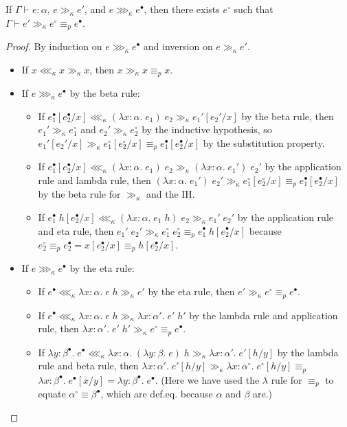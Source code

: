 \begin{lemma}\label{cr_lemma}
If $\Gamma\vdash e:\alpha$, $e\gg_\kappa e'$, and $e\ggg_\kappa e^\bullet$, then there exists $e^\circ$ such that $\Gamma\vdash e'\gg_\kappa e^\circ\equiv_p e^\bullet$.
\end{lemma}
\begin{proof}
By induction on $e\ggg_\kappa e^\bullet$ and inversion on $e\gg_\kappa e'$.
\begin{itemize}
\item If $x\lll_\kappa x\gg_\kappa x$, then $x\gg_\kappa x\equiv_p x$.
\item If $e\ggg_\kappa e^\bullet$ by the beta rule:
\begin{itemize}
\item If $e_1^\bullet[e_2^\bullet/x]\lll_\kappa(\lambda x:\alpha.\;e_1)\;e_2\gg_\kappa e_1'[e_2'/x]$ by the beta rule, then $e_1'\gg_\kappa e_1^\circ$ and $e_2'\gg_\kappa e_2^\circ$ by the inductive hypothesis, so $e_1'[e_2'/x]\gg_\kappa e_1^\circ[e_2^\circ/x]\equiv_p e_1^\bullet[e_2^\bullet/x]$ by the substitution property.
\item If $e_1^\bullet[e_2^\bullet/x]\lll_\kappa(\lambda x:\alpha.\;e_1)\;e_2\gg_\kappa (\lambda x:\alpha.\;e_1')\;e_2'$ by the application rule and lambda rule, then $(\lambda x:\alpha.\;e_1')\;e_2'\gg_\kappa e_1^\circ[e_2^\circ/x]\equiv_p e_1^\bullet[e_2^\bullet/x]$ by the beta rule for $\gg_\kappa$ and the IH.
\item If $e_1^\bullet\;h[e_2^\bullet/x]\lll_\kappa(\lambda x:\alpha.\;e_1\;h)\;e_2\gg_\kappa e_1'\;e_2'$ by the application rule and eta rule, then $e_1'\;e_2'\gg_\kappa e_1^\circ\;e_2^\circ\equiv_p e_1^\bullet\;h[e_2^\bullet/x]$ because $e_2^\circ\equiv_p e_2^\bullet=x[e_2^\bullet/x]\equiv_p h[e_2^\bullet/x]$.
\end{itemize}
\item If $e\ggg_\kappa e^\bullet$ by the eta rule:
\begin{itemize}
\item If $e^\bullet\lll_\kappa\lambda x:\alpha.\;e\;h\gg_\kappa e'$ by the eta rule, then $e'\gg_\kappa e^\circ\equiv_p e^\bullet$.
\item If $e^\bullet\lll_\kappa\lambda x:\alpha.\;e\;h\gg_\kappa \lambda x:\alpha'.\;e'\;h'$ by the lambda rule and application rule, then $\lambda x:\alpha'.\;e'\;h'\gg_\kappa e^\circ\equiv_p e^\bullet$.
\item If $\lambda y:\beta^\bullet.\;e^\bullet\lll_\kappa\lambda x:\alpha.\;(\lambda y:\beta.\;e)\;h\gg_\kappa \lambda x:\alpha'.\;e'[h/y]$ by the lambda rule and beta rule, then $\lambda x:\alpha'.\;e'[h/y]\gg_\kappa \lambda x:\alpha^\circ.\;e^\circ[h/y]\equiv_p$\\$\lambda x:\beta^\bullet.\;e^\bullet[x/y]=\lambda y:\beta^\bullet.\;e^\bullet$. (Here we have used the $\lambda$ rule for $\equiv_p$ to equate $\alpha^\circ\equiv\beta^\bullet$, which are def.eq. because $\alpha$ and $\beta$ are.)

\end{itemize}
\end{itemize}
\end{proof}
